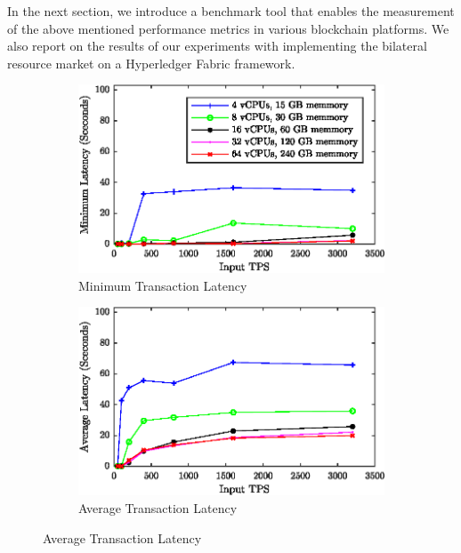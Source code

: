 \documentclass[conference]{IEEEtran}
\begin{document}
In the next section, we introduce a benchmark tool that enables the measurement of the above mentioned performance metrics in various blockchain platforms. We also report on the results of our experiments with implementing the bilateral resource market on a Hyperledger Fabric framework.



\begin{figure}
\centering
\begin{subfigure}{0.99\columnwidth}
\includegraphics[width=\columnwidth]{figs/min.eps}%
\caption{Minimum Transaction Latency}%
\label{latency_min}%
\end{subfigure}\hfill%
\begin{subfigure}{0.99\columnwidth}
\includegraphics[width=\columnwidth]{figs/avg.eps}%
\caption{Average Transaction Latency}%
\label{latency_avg}%
\end{subfigure}\hfill%
\vspace{7mm}

\end{figure}
\end{document}
